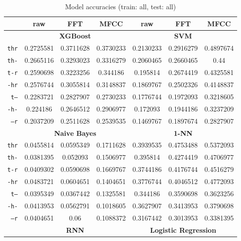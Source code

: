\documentclass[../main.tex]{subfiles}
\begin{document}
\begin{table}[ht]
	\centering
	\caption{Model accuracies (train: all, test: all)}
	\vspace{-0.15cm}
	\label{tab:model_acc_all_all}
	\begin{small}
	\begin{tabular}{|r|c|c|c|c|c|c|}
		\hline
		 & \textbf{raw} & \textbf{FFT} & \textbf{MFCC} & \textbf{raw} & \textbf{FFT} & \textbf{MFCC} \\
		\hline
		 & \multicolumn{3}{|c|}{\textbf{XGBoost}} & \multicolumn{3}{|c|}{\textbf{SVM}} \\
		\hline
		\texttt{thr} & 0.2725581 & 0.3711628 & 0.3730233 & 0.2130233 & 0.2916279 & 0.4897674 \\
		\texttt{th-} & 0.2665116 & 0.3293023 & 0.3316279 & 0.2060465 & 0.2660465 & 0.44 \\
		\texttt{t-r} & 0.2590698 & 0.3223256 & 0.344186 & 0.195814 & 0.2674419 & 0.4325581 \\
		\texttt{-hr} & 0.2576744 & 0.3055814 & 0.3148837 & 0.1869767 & 0.2502326 & 0.4148837 \\
		\texttt{t--} & 0.2283721 & 0.2827907 & 0.2730233 & 0.1776744 & 0.1972093 & 0.3218605 \\
		\texttt{-h-} & 0.224186 & 0.2646512 & 0.2906977 & 0.172093 & 0.1944186 & 0.3237209 \\
		\texttt{--r} & 0.2037209 & 0.2511628 & 0.2539535 & 0.1469767 & 0.1897674 & 0.2827907 \\
		\hline
		 & \multicolumn{3}{|c|}{\textbf{Naive Bayes}} & \multicolumn{3}{|c|}{\textbf{1-NN}} \\
		\hline
		\texttt{thr} & 0.0455814 & 0.0595349 & 0.1711628 & 0.3939535 & 0.4753488 & 0.5372093 \\
		\texttt{th-} & 0.0381395 & 0.052093 & 0.1506977 & 0.395814 & 0.4274419 & 0.4706977 \\
		\texttt{t-r} & 0.0409302 & 0.0590698 & 0.1669767 & 0.3744186 & 0.4176744 & 0.4516279 \\
		\texttt{-hr} & 0.0483721 & 0.0604651 & 0.1404651 & 0.3776744 & 0.4046512 & 0.4772093 \\
		\texttt{t--} & 0.0395349 & 0.0367442 & 0.1325581 & 0.344186 & 0.3590698 & 0.3623256 \\
		\texttt{-h-} & 0.0413953 & 0.0562791 & 0.1018605 & 0.3627907 & 0.3413953 & 0.3790698 \\
		\texttt{--r} & 0.0404651 & 0.06 & 0.1088372 & 0.3167442 & 0.3013953 & 0.3381395 \\
		\hline
		 & \multicolumn{3}{|c|}{\textbf{RNN}} & \multicolumn{3}{|c|}{\textbf{Logistic Regression}} \\

\end{tabular}
\end{small}
\end{table}
\end{document}

